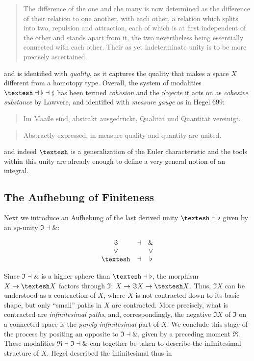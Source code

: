 \documentclass{article}
\begin{document}
\begin{quote}
    The difference of the one and the many is now determined as the difference of their relation to one another, with each other, a relation which splits into two, repulsion and attraction, each of which is at first independent of the other and stands apart from it, the two nevertheless being essentially connected with each other. Their as yet indeterminate unity is to be more precisely ascertained.
\end{quote}

and is identified with \emph{quality}, as it captures the quality that makes a space $X$ different from a homotopy type. Overall, the system of modalities $\textrm{\textesh}\dashv\flat\dashv\sharp$ has been termed \emph{cohesion} and the objects it acts on as \emph{cohesive substance} by Lawvere\cite{Coh}, and identified with \emph{measure} \emph{gauge} as in Hegel 699:

\begin{quote}
    Im Maaße sind, abstrakt ausgedrückt, Qualität und Quantität vereinigt.
\end{quote}

\begin{quote}
    Abstractly expressed, in measure quality and quantity are united.
\end{quote}

and indeed $\textrm{\textesh}$ is a generalization of the Euler characteristic and the tools within this unity are already enough to define a very general notion of an integral\cite{Nlabintegral}.

\subsection{The Aufhebung of Finiteness}
Next we introduce an Aufhebung of the last derived unity $\textrm{\textesh}\dashv\flat$ given by an $sp$-unity $ \Im\dashv\&$:


$$
  \begin{array}{ccc}
    \Im &\dashv& \&
     \\
     \vee && \vee
     \\
    \textrm{\textesh} &\dashv& \flat
    \end{array}
$$

Since $\Im\dashv\&$ is a higher sphere than $\textrm{\textesh}\dashv\flat$, the morphism $X\rightarrow \textrm{\textesh} X$ factors through $\Im$: $X\rightarrow\Im X\rightarrow\textrm{\textesh} X$. Thus, $\Im X$ can be understood as a contraction of $X$, where $X$ is not contracted down to its basic shape, but only ``small'' paths in $X$ are contracted. More precisely, what is contracted are \emph{infinitesimal paths}, and, correspondingly, the negative $\overline{\Im} X$ of $\Im$ on a connected space is the \emph{purely infinitesimal} part of $X$. We conclude this stage of the process by positing an opposite to $\Im\dashv\&$, given by a preceding moment $\Re$. These modalities $\Re\dashv\Im\dashv\&$ can together be taken to describe the infinitesimal structure of $X$. Hegel described the infinitesimal thus in
\end{document}
